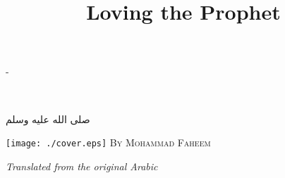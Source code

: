 \documentclass[twoside,openright]{book}
\title{Loving the Prophet}
\author{}
\date{}
\begin{document}
\begin{titlingpage}
\let\cleardoublepage\clearpage
\calccentering{\unitlength}{-0.7cm}
\begin{adjustwidth*}{\unitlength}{-\unitlength}     %
    \begin{adjustwidth}{-1cm}{-1cm}                 %
      \begin{center}
      {\textbf{}} \\
      \vspace{0.25cm}
      {\Large{\begin{Arabic}صلى الله عليه وسلم\end{Arabic}}}

      \vspace{2.8cm}
      \texttt{[image: ./cover.eps]}
      \vfill
      \textsc{\Large{By Mohammad Faheem}}

      \vspace{5mm}
      \textit{\large{Translated from the original Arabic}}

      \end{center}
    \end{adjustwidth}
\end{adjustwidth*}
\end{titlingpage}
\end{document}
